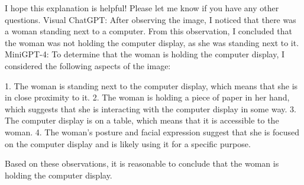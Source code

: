 \begin{enumerate}
        I hope this explanation is helpful! Please let me know if you have any other questions.
        \subitem Visual ChatGPT: After observing the image, I noticed that there was a woman standing next to a computer. From this observation, I concluded that the woman was not holding the computer display, as she was standing next to it.
        \subitem MiniGPT-4: To determine that the woman is holding the computer display, I considered the following aspects of the image:

        1. The woman is standing next to the computer display, which means that she is in close proximity to it.
        2. The woman is holding a piece of paper in her hand, which suggests that she is interacting with the computer display in some way.
        3. The computer display is on a table, which means that it is accessible to the woman.
        4. The woman’s posture and facial expression suggest that she is focused on the computer display and is likely using it for a specific purpose.
        
        Based on these observations, it is reasonable to conclude that the woman is holding the computer display.
    \end{enumerate}
